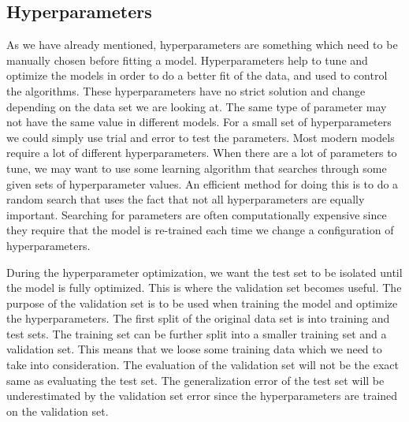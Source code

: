 \documentclass[a4paper, american, 12pt]{report}
\begin{document}
	\subsection{Hyperparameters}
	\label{subsect:Theory-Hyperparameters}
	As we have already mentioned, hyperparameters are something which need to be manually chosen before fitting a model. Hyperparameters help to tune and optimize the models in order to do a better fit of the data, and used to control the algorithms. These hyperparameters have no strict solution and change depending on the data set we are looking at. The same type of parameter may not have the same value in different models. For a small set of hyperparameters we could simply use trial and error to test the parameters. Most modern models require a lot of different hyperparameters. When there are a lot of parameters to tune, we may want to use some learning algorithm that searches through some given sets of hyperparameter values. An efficient method for doing this is to do a random search that uses the fact that not all hyperparameters are equally important. Searching for parameters are often computationally expensive since they require that the model is re-trained each time we change a configuration of hyperparameters.
	
	During the hyperparameter optimization, we want the test set to be isolated until the model is fully optimized. This is where the validation set becomes useful. The purpose of the validation set is to be used when training the model and optimize the hyperparameters. The first split of the original data set is into training and test sets. The training set can be further split into a smaller training set and a validation set. This means that we loose some training data which we need to take into consideration. The evaluation of the validation set will not be the exact same as evaluating the test set. The generalization error of the test set will be underestimated by the validation set error since the hyperparameters are trained on the validation set.
	
	
\end{document}
